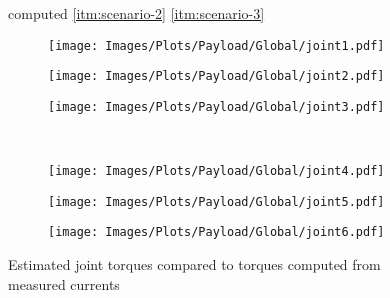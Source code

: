 \begin{figure*}
    \centering
    \newcommand*{\figsize}{0.32\textwidth}

    \begin{center}
    \footnotesize{{\legblue} computed \hspace{0.5em} {\legred} \ref{itm:scenario-2} \hspace{0.5em} {\legyellow} \ref{itm:scenario-3}}
    \end{center}

    \begin{subfigure}[b]{\figsize}
        \centering
        \texttt{[image: Images/Plots/Payload/Global/joint1.pdf]}
    \end{subfigure}
    \hfill
    \begin{subfigure}[b]{\figsize}
        \centering
        \texttt{[image: Images/Plots/Payload/Global/joint2.pdf]}
    \end{subfigure}
    \hfill
    \begin{subfigure}[b]{\figsize}
        \centering
        \texttt{[image: Images/Plots/Payload/Global/joint3.pdf]}
    \end{subfigure}
    \\ \vspace{0.25em}
    \begin{subfigure}[b]{\figsize}
        \centering
        \texttt{[image: Images/Plots/Payload/Global/joint4.pdf]}
    \end{subfigure}
    \hfill
    \begin{subfigure}[b]{\figsize}
        \centering
        \texttt{[image: Images/Plots/Payload/Global/joint5.pdf]}
    \end{subfigure}
    \hfill
    \begin{subfigure}[b]{\figsize}
        \centering
        \texttt{[image: Images/Plots/Payload/Global/joint6.pdf]}
    \end{subfigure}

    \caption{Estimated joint torques compared to torques computed from measured currents}
    \label{fig:payload}
\end{figure*}
